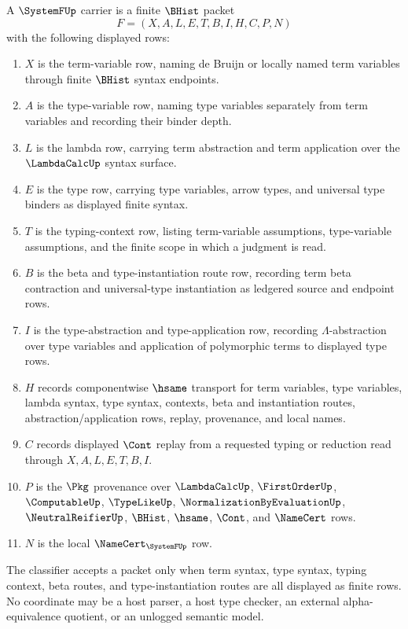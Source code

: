 \begin{definition}
\label{def:system-f-carrier}
A $\SystemFUp$ carrier is a finite $\BHist$ packet
$$
F=(X,A,L,E,T,B,I,H,C,P,N)
$$
with the following displayed rows:
\begin{enumerate}
\item $X$ is the term-variable row, naming de Bruijn or locally named term variables through finite $\BHist$ syntax endpoints.
\item $A$ is the type-variable row, naming type variables separately from term variables and recording their binder depth.
\item $L$ is the lambda row, carrying term abstraction and term application over the $\LambdaCalcUp$ syntax surface.
\item $E$ is the type row, carrying type variables, arrow types, and universal type binders as displayed finite syntax.
\item $T$ is the typing-context row, listing term-variable assumptions, type-variable assumptions, and the finite scope in which a judgment is read.
\item $B$ is the beta and type-instantiation route row, recording term beta contraction and universal-type instantiation as ledgered source and endpoint rows.
\item $I$ is the type-abstraction and type-application row, recording $\Lambda$-abstraction over type variables and application of polymorphic terms to displayed type rows.
\item $H$ records componentwise $\hsame$ transport for term variables, type variables, lambda syntax, type syntax, contexts, beta and instantiation routes, abstraction/application rows, replay, provenance, and local names.
\item $C$ records displayed $\Cont$ replay from a requested typing or reduction read through $X,A,L,E,T,B,I$.
\item $P$ is the $\Pkg$ provenance over $\LambdaCalcUp$, $\FirstOrderUp$, $\ComputableUp$, $\TypeLikeUp$, $\NormalizationByEvaluationUp$, $\NeutralReifierUp$, $\BHist$, $\hsame$, $\Cont$, and $\NameCert$ rows.
\item $N$ is the local $\NameCert_{\SystemFUp}$ row.
\end{enumerate}
The classifier accepts a packet only when term syntax, type syntax, typing context, beta routes, and type-instantiation routes are all displayed as finite rows. No coordinate may be a host parser, a host type checker, an external alpha-equivalence quotient, or an unlogged semantic model.
\end{definition}

